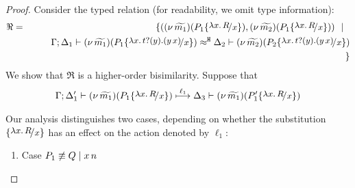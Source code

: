 \begin{proof}
	Consider the typed relation (for readability, we omit type information):
	\begin{eqnarray*}
		\Re	&=&	\set{
					(\newsp{\widetilde{m_1}}{P_1 \subst{{\abs{x}{R}}}{x}}, \newsp{\widetilde{m_2}}{P_1 \subst{{\abs{x}{R}}}{x}})
					\setbar\\
			&&		\qquad \horel{\Gamma}{\Delta_1}{\newsp{\widetilde{m_1}}{P_1 \subst{\trvalx{t}}{x} }}
					{\hwb}
					{\Delta_2}{\newsp{\widetilde{m_2}}{P_2 \subst{\trvalx{t}}{x} }}
			\\
			&&		}
	\end{eqnarray*}
	We show that $\Re$ is a higher-order bisimilarity. Suppose that 
	\begin{eqnarray}
		\horel{\Gamma}{\Delta_1'}{\newsp{\widetilde{m_1}}{P_1 \subst{{\abs{x}{R}}}{x} }}
		{\hby{\ell_1}}
		{\Delta_3}{\newsp{\widetilde{m_1}}{P_1' \subst{{\abs{x}{R}}}{x} }}
		\label{lem:proc_subst1}
	\end{eqnarray}

	Our analysis distinguishes two cases, depending on whether the substitution $\subst{{\abs{x}{R}}}{x}$ has an effect on the action denoted by $\ell_1$:
	\begin{enumerate}
		\item	Case $P_1 \not\equiv Q \;|\; x\, {n}$ 


\end{enumerate}
\end{proof}
